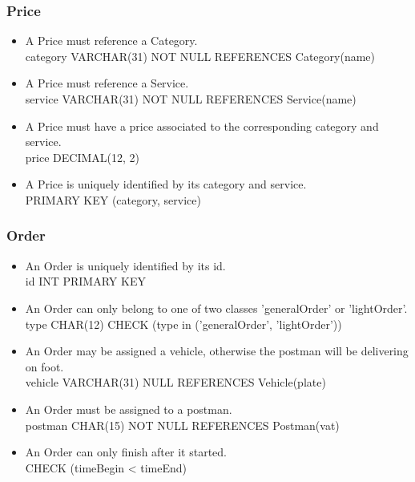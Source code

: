 \documentclass{report}[a4paper]
\theoremstyle{remark}
\begin{document}
\subsubsection{Price}
\begin{itemize}
    \item A Price must reference a Category. \\ category VARCHAR(31) NOT NULL REFERENCES Category(name)
    \item A Price must reference a Service. \\ service VARCHAR(31) NOT NULL REFERENCES Service(name)
    \item A Price must have a price associated to the corresponding category and service. \\ price DECIMAL(12, 2)
    \item A Price is uniquely identified by its category and service. \\ PRIMARY KEY (category, service)
\end{itemize}
\subsubsection{Order}
\begin{itemize}
    \item An Order is uniquely identified by its id. \\ id INT PRIMARY KEY
    \item An Order can only belong to one of two classes 'generalOrder' or 'lightOrder'. \\ type CHAR(12) CHECK (type in ('generalOrder', 'lightOrder'))
    \item An Order may be assigned a vehicle, otherwise the postman will be delivering on foot. \\ vehicle VARCHAR(31) NULL REFERENCES Vehicle(plate)
    \item An Order must be assigned to a postman. \\ postman CHAR(15) NOT NULL REFERENCES Postman(vat)
    \item An Order can only finish after it started. \\ CHECK (timeBegin < timeEnd)
\end{itemize}
\end{document}
